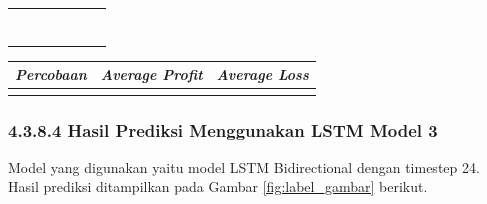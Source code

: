 \begin{table}[H]
\begin{tabular}{|c|c|l|l|l|l|l|}
                         &                       &               &  &                                         &                                      &               \\ \cline{1-3} \cline{5-7} 
                         &                       &               &  &                                         &                                      &               \\ \cline{1-3} \cline{5-7} 
  \multicolumn{1}{|l|}{} & \multicolumn{1}{l|}{} &               &  &                                         &                                      &               \\ \cline{1-3} \cline{5-7} 
  \multicolumn{1}{|l|}{} & \multicolumn{1}{l|}{} &               &  &                                         &                                      &               \\ \cline{1-3} \cline{5-7} 
  \multicolumn{1}{|l|}{} & \multicolumn{1}{l|}{} &               &  &                                         &                                      &               \\ \cline{1-3} \cline{5-7} 
  \multicolumn{1}{|l|}{} & \multicolumn{1}{l|}{} &               &  &                                         &                                      &               \\ \cline{1-3} \cline{5-7} 
  \multicolumn{1}{|l|}{} & \multicolumn{1}{l|}{} &               &  &                                         &                                      &               \\ \cline{1-3} \cline{5-7} 
  \end{tabular}
  \end{table}


\begin{table}[H]
  \centering
    \begin{tabular}{|c|c|l|}
    \hline
    \textit{Percobaan} & \textit{Average Profit} & \textit{Average Loss} \\ \hline
                       &                         &                       \\ \hline
    \end{tabular}
\end{table}

\subsubsection*{4.3.8.4 Hasil Prediksi Menggunakan LSTM Model 3}
Model yang digunakan yaitu model LSTM Bidirectional dengan timestep 24. Hasil prediksi ditampilkan pada Gambar \ref{fig:label_gambar} berikut.


